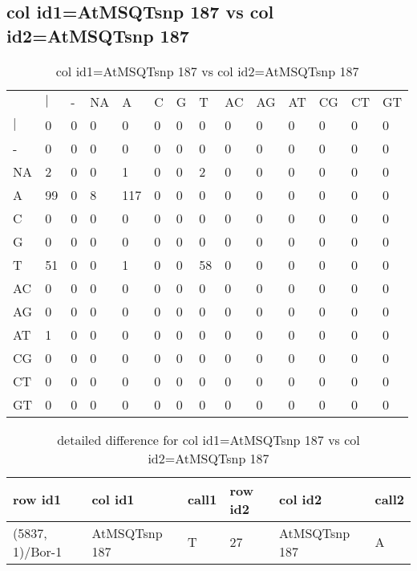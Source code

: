 \subsection{col id1=AtMSQTsnp 187 vs col id2=AtMSQTsnp 187}
\begin{center}
\begin{longtable}{|l|l|l|l|l|l|l|l|l|l|l|l|l|l|}
\caption{col id1=AtMSQTsnp 187 vs col id2=AtMSQTsnp 187} \label{table_dm752}\\
\hline
\\
\hline
&$|$&-&NA&A&C&G&T&AC&AG&AT&CG&CT&GT\\
$|$&0&0&0&0&0&0&0&0&0&0&0&0&0\\
-&0&0&0&0&0&0&0&0&0&0&0&0&0\\
NA&2&0&0&1&0&0&2&0&0&0&0&0&0\\
A&99&0&8&117&0&0&0&0&0&0&0&0&0\\
C&0&0&0&0&0&0&0&0&0&0&0&0&0\\
G&0&0&0&0&0&0&0&0&0&0&0&0&0\\
T&51&0&0&1&0&0&58&0&0&0&0&0&0\\
AC&0&0&0&0&0&0&0&0&0&0&0&0&0\\
AG&0&0&0&0&0&0&0&0&0&0&0&0&0\\
AT&1&0&0&0&0&0&0&0&0&0&0&0&0\\
CG&0&0&0&0&0&0&0&0&0&0&0&0&0\\
CT&0&0&0&0&0&0&0&0&0&0&0&0&0\\
GT&0&0&0&0&0&0&0&0&0&0&0&0&0\\
\hline
\end{longtable}
\end{center}

\begin{center}
\begin{longtable}{|l|l|l|l|l|l|}
\caption{detailed difference for col id1=AtMSQTsnp 187 vs col id2=AtMSQTsnp 187} \label{table_dm753}\\
\hline
row id1&col id1&call1&row id2&col id2&call2\\
\hline
(5837, 1)/Bor-1&AtMSQTsnp 187&T&27&AtMSQTsnp 187&A\\
\hline
\end{longtable}
\end{center}

